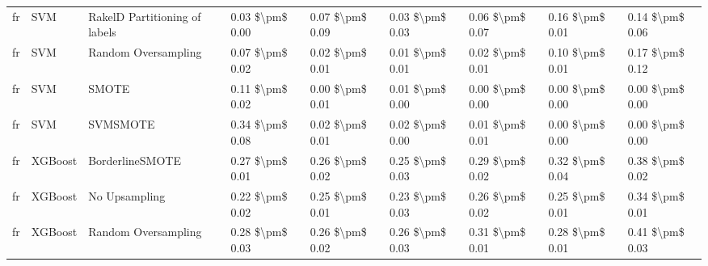 \begin{tabular}{lllllllll}
      fr &                             SVM & RakelD Partitioning of labels &     0.03 \$\textbackslash pm\$ 0.00 &           0.07 \$\textbackslash pm\$ 0.09 &       0.03 \$\textbackslash pm\$ 0.03 &        0.06 \$\textbackslash pm\$ 0.07 &                         0.16 \$\textbackslash pm\$ 0.01 &     0.14 \$\textbackslash pm\$ 0.06 \\
      fr &                             SVM &           Random Oversampling &     0.07 \$\textbackslash pm\$ 0.02 &           0.02 \$\textbackslash pm\$ 0.01 &       0.01 \$\textbackslash pm\$ 0.01 &        0.02 \$\textbackslash pm\$ 0.01 &                         0.10 \$\textbackslash pm\$ 0.01 &     0.17 \$\textbackslash pm\$ 0.12 \\
      fr &                             SVM &                         SMOTE &     0.11 \$\textbackslash pm\$ 0.02 &           0.00 \$\textbackslash pm\$ 0.01 &       0.01 \$\textbackslash pm\$ 0.00 &        0.00 \$\textbackslash pm\$ 0.00 &                         0.00 \$\textbackslash pm\$ 0.00 &     0.00 \$\textbackslash pm\$ 0.00 \\
      fr &                             SVM &                      SVMSMOTE &     0.34 \$\textbackslash pm\$ 0.08 &           0.02 \$\textbackslash pm\$ 0.01 &       0.02 \$\textbackslash pm\$ 0.00 &        0.01 \$\textbackslash pm\$ 0.01 &                         0.00 \$\textbackslash pm\$ 0.00 &     0.00 \$\textbackslash pm\$ 0.00 \\
      fr &                         XGBoost &               BorderlineSMOTE &     0.27 \$\textbackslash pm\$ 0.01 &           0.26 \$\textbackslash pm\$ 0.02 &       0.25 \$\textbackslash pm\$ 0.03 &        0.29 \$\textbackslash pm\$ 0.02 &                         0.32 \$\textbackslash pm\$ 0.04 &     0.38 \$\textbackslash pm\$ 0.02 \\
      fr &                         XGBoost &                 No Upsampling &     0.22 \$\textbackslash pm\$ 0.02 &           0.25 \$\textbackslash pm\$ 0.01 &       0.23 \$\textbackslash pm\$ 0.03 &        0.26 \$\textbackslash pm\$ 0.02 &                         0.25 \$\textbackslash pm\$ 0.01 &     0.34 \$\textbackslash pm\$ 0.01 \\
      fr &                         XGBoost &           Random Oversampling &     0.28 \$\textbackslash pm\$ 0.03 &           0.26 \$\textbackslash pm\$ 0.02 &       0.26 \$\textbackslash pm\$ 0.03 &        0.31 \$\textbackslash pm\$ 0.01 &                         0.28 \$\textbackslash pm\$ 0.01 &     0.41 \$\textbackslash pm\$ 0.03 \\

\end{tabular}
